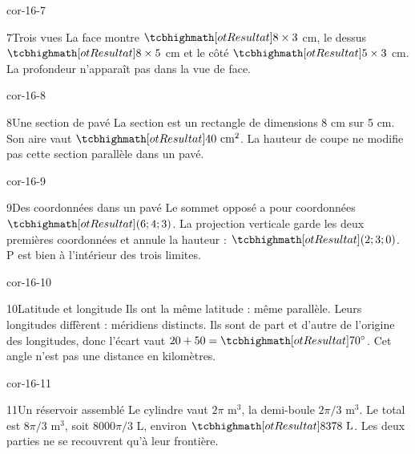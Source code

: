 \begin{blocLivre}{cor-16-7}\begin{corrige}{7}{Trois vues}
La face montre $\res{8\times3}$ cm, le dessus $\res{8\times5}$ cm et le côté $\res{5\times3}$ cm. La profondeur n’apparaît pas dans la vue de face.
\label{fig-cor-16-7}
\end{corrige}\end{blocLivre}
\begin{blocLivre}{cor-16-8}\begin{corrige}{8}{Une section de pavé}
La section est un rectangle de dimensions 8 cm sur 5 cm. Son aire vaut $\res{40\text{ cm}^2}$. La hauteur de coupe ne modifie pas cette section parallèle dans un pavé.
\label{fig-cor-16-8}
\end{corrige}\end{blocLivre}
\begin{blocLivre}{cor-16-9}\begin{corrige}{9}{Des coordonnées dans un pavé}
Le sommet opposé a pour coordonnées $\res{(6;4;3)}$. La projection verticale garde les deux premières coordonnées et annule la hauteur : $\res{(2;3;0)}$. P est bien à l’intérieur des trois limites.
\label{fig-cor-16-9}
\end{corrige}\end{blocLivre}
\begin{blocLivre}{cor-16-10}\begin{corrige}{10}{Latitude et longitude}
Ils ont la même latitude : même parallèle. Leurs longitudes diffèrent : méridiens distincts. Ils sont de part et d’autre de l’origine des longitudes, donc l’écart vaut $20+50=\res{70^\circ}$. Cet angle n’est pas une distance en kilomètres.
\label{fig-cor-16-10}
\end{corrige}\end{blocLivre}
\begin{blocLivre}{cor-16-11}\begin{corrige}{11}{Un réservoir assemblé}
Le cylindre vaut $2\pi$ m$^3$, la demi-boule $2\pi/3$ m$^3$. Le total est $8\pi/3$ m$^3$, soit $8000\pi/3$ L, environ $\res{8378\text{ L}}$. Les deux parties ne se recouvrent qu’à leur frontière.
\label{fig-cor-16-11}
\end{corrige}\end{blocLivre}
